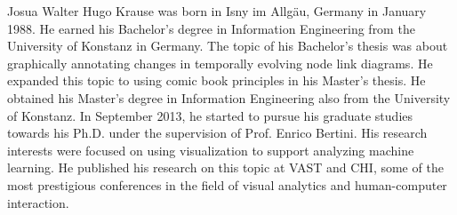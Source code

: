 Josua Walter Hugo Krause was born in Isny im Allg\"au, Germany in January 1988.
He earned his Bachelor's degree in Information Engineering from the University of Konstanz in Germany.
The topic of his Bachelor's thesis was about graphically annotating changes in temporally evolving node link diagrams.
He expanded this topic to using comic book principles in his Master's thesis.
He obtained his Master's degree in Information Engineering also from the University of Konstanz.
In September 2013, he started to pursue his graduate studies towards his Ph.D. under the supervision of Prof. Enrico Bertini.
His research interests were focused on using visualization to support analyzing machine learning.
He published his research on this topic at VAST and CHI, some of the most prestigious conferences in the field of visual analytics and human-computer interaction.
